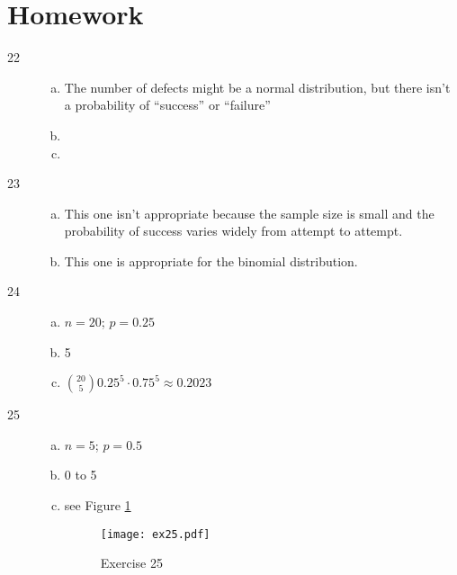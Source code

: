 \documentclass[letterpaper]{exam}
\begin{document}
    \section{Homework}
    \begin{description}

      \item[22] 
        \begin{enumerate}[(a)]
          \item {}
            The number of defects might be a normal distribution, but there
            isn't a probability of ``success'' or ``failure''

          \item {}

          \item {}
        \end{enumerate}

      \item[23]
        \begin{enumerate}[(a)]
          \item This one isn't appropriate because the sample size is small and
            the probability of success varies widely from attempt to attempt.

          \item This one is appropriate for the binomial distribution.
        \end{enumerate}

      \item[24]
        \begin{enumerate}[(a)]
          \item $n = 20$; $p = 0.25$
          \item 5
          \item $ \binom{20}{5} 0.25^5 \cdot 0.75^5 \approx \boxed{ 0.2023 } $
        \end{enumerate}

      \item[25]
        \begin{enumerate}[(a)]
          \item $n = 5$; $p = 0.5$

          \item 0 to 5

          \item see Figure \ref{fig:ex25}

            \begin{figure}[H]
              \centering
              \texttt{[image: ex25.pdf]}
              \caption{Exercise 25}
              \label{fig:ex25}
            \end{figure}


\end{enumerate}
\end{description}
\end{document}
